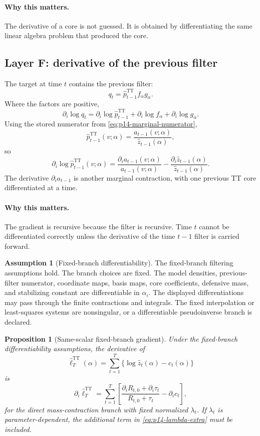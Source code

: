 \documentclass[11pt]{article}
\newcommand{\TT}{\mathrm{TT}}
\renewcommand{\[}{\begin{equation}}
\renewcommand{\]}{\end{equation}}
\newtheorem{proposition}{Proposition}
\theoremstyle{definition}
\newtheorem{assumption}{Assumption}
\theoremstyle{remark}
\begin{document}
\paragraph{Why this matters.}
The derivative of a core is not guessed.  It is obtained by differentiating
the same linear algebra problem that produced the core.

\subsection*{Layer F: derivative of the previous filter}

The target at time \(t\) contains the previous filter:
\[
  q_t
  =
  \widehat p_{t-1}^{\TT}f_\alpha g_\alpha.
  \label{eq:p14-layerF-q}
\]
Where the factors are positive,
\[
  \partial_i\log q_t
  =
  \partial_i\log\widehat p_{t-1}^{\TT}
  +
  \partial_i\log f_\alpha
  +
  \partial_i\log g_\alpha.
  \label{eq:p14-layerF-logq}
\]
Using the stored numerator from \eqref{eq:p14-marginal-numerator},
\[
  \widehat p_{t-1}^{\TT}(v;\alpha)
  =
  \frac{a_{t-1}(v;\alpha)}{\widehat z_{t-1}(\alpha)},
  \label{eq:p14-layerF-ratio}
\]
so
\[
  \partial_i\log\widehat p_{t-1}^{\TT}(v;\alpha)
  =
  \frac{\partial_i a_{t-1}(v;\alpha)}{a_{t-1}(v;\alpha)}
  -
  \frac{\partial_i\widehat z_{t-1}(\alpha)}
       {\widehat z_{t-1}(\alpha)}.
  \label{eq:p14-layerF-prev}
\]
The derivative \(\partial_i a_{t-1}\) is another marginal contraction, with
one previous TT core differentiated at a time.

\paragraph{Why this matters.}
The gradient is recursive because the filter is recursive.  Time \(t\) cannot
be differentiated correctly unless the derivative of the time \(t-1\) filter
is carried forward.

\begin{assumption}[Fixed-branch differentiability]
The fixed-branch filtering assumptions hold.  The branch choices are fixed.
The model densities, previous-filter numerator, coordinate maps, basis maps,
core coefficients, defensive mass, and stabilizing constant are differentiable
in \(\alpha_i\).  The displayed differentiations may pass through the finite
contractions and integrals.  The fixed interpolation or least-squares systems
are nonsingular, or a differentiable pseudoinverse branch is declared.
\end{assumption}

\begin{proposition}[Same-scalar fixed-branch gradient]
Under the fixed-branch differentiability assumptions, the derivative of
\[
  \widehat\ell_T^{\TT}(\alpha)
  =
  \sum_{t=1}^T
  \{\log\widehat z_t(\alpha)-c_t(\alpha)\}
\]
is
\[
  \partial_i\widehat\ell_T^{\TT}
  =
  \sum_{t=1}^T
  \left[
  \frac{\partial_iR_{t,0}+\partial_i\tau_t}
       {R_{t,0}+\tau_t}
  -
  \partial_i c_t
  \right],
  \label{eq:p14-final-score}
\]
for the direct mass-contraction branch with fixed normalized
\(\lambda_t\).  If \(\lambda_t\) is parameter-dependent, the additional term
in \eqref{eq:p14-lambda-extra} must be included.
\end{proposition}
\end{document}
